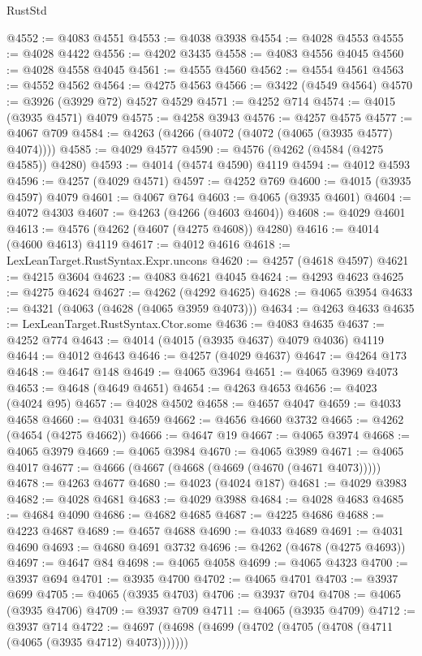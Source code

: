 \begin{lexlean}{RustStd}
\begin{coremodule}
@4552 := @4083 @4551
@4553 := @4038 @3938
@4554 := @4028 @4553
@4555 := @4028 @4422
@4556 := @4202 @3435
@4558 := @4083 @4556 @4045
@4560 := @4028 @4558 @4045
@4561 := @4555 @4560
@4562 := @4554 @4561
@4563 := @4552 @4562
@4564 := @4275 @4563
@4566 := @3422 (@4549 @4564)
@4570 := @3926 (@3929 @72) @4527 @4529
@4571 := @4252 @714
@4574 := @4015 (@3935 @4571) @4079
@4575 := @4258 @3943
@4576 := @4257 @4575
@4577 := @4067 @709
@4584 := @4263 (@4266 (@4072 (@4072 (@4065 (@3935 @4577) @4074))))
@4585 := @4029 @4577
@4590 := @4576 (@4262 (@4584 (@4275 @4585)) @4280)
@4593 := @4014 (@4574 @4590) @4119
@4594 := @4012 @4593
@4596 := @4257 (@4029 @4571)
@4597 := @4252 @769
@4600 := @4015 (@3935 @4597) @4079
@4601 := @4067 @764
@4603 := @4065 (@3935 @4601)
@4604 := @4072 @4303
@4607 := @4263 (@4266 (@4603 @4604))
@4608 := @4029 @4601
@4613 := @4576 (@4262 (@4607 (@4275 @4608)) @4280)
@4616 := @4014 (@4600 @4613) @4119
@4617 := @4012 @4616
@4618 := LexLeanTarget.RustSyntax.Expr.uncons
@4620 := @4257 (@4618 @4597)
@4621 := @4215 @3604
@4623 := @4083 @4621 @4045
@4624 := @4293 @4623
@4625 := @4275 @4624
@4627 := @4262 (@4292 @4625)
@4628 := @4065 @3954
@4633 := @4321 (@4063 (@4628 (@4065 @3959 @4073)))
@4634 := @4263 @4633
@4635 := LexLeanTarget.RustSyntax.Ctor.some
@4636 := @4083 @4635
@4637 := @4252 @774
@4643 := @4014 (@4015 (@3935 @4637) @4079 @4036) @4119
@4644 := @4012 @4643
@4646 := @4257 (@4029 @4637)
@4647 := @4264 @173
@4648 := @4647 @148
@4649 := @4065 @3964
@4651 := @4065 @3969 @4073
@4653 := @4648 (@4649 @4651)
@4654 := @4263 @4653
@4656 := @4023 (@4024 @95)
@4657 := @4028 @4502
@4658 := @4657 @4047
@4659 := @4033 @4658
@4660 := @4031 @4659
@4662 := @4656 @4660 @3732
@4665 := @4262 (@4654 (@4275 @4662))
@4666 := @4647 @19
@4667 := @4065 @3974
@4668 := @4065 @3979
@4669 := @4065 @3984
@4670 := @4065 @3989
@4671 := @4065 @4017
@4677 := @4666 (@4667 (@4668 (@4669 (@4670 (@4671 @4073)))))
@4678 := @4263 @4677
@4680 := @4023 (@4024 @187)
@4681 := @4029 @3983
@4682 := @4028 @4681
@4683 := @4029 @3988
@4684 := @4028 @4683
@4685 := @4684 @4090
@4686 := @4682 @4685
@4687 := @4225 @4686
@4688 := @4223 @4687
@4689 := @4657 @4688
@4690 := @4033 @4689
@4691 := @4031 @4690
@4693 := @4680 @4691 @3732
@4696 := @4262 (@4678 (@4275 @4693))
@4697 := @4647 @84
@4698 := @4065 @4058
@4699 := @4065 @4323
@4700 := @3937 @694
@4701 := @3935 @4700
@4702 := @4065 @4701
@4703 := @3937 @699
@4705 := @4065 (@3935 @4703)
@4706 := @3937 @704
@4708 := @4065 (@3935 @4706)
@4709 := @3937 @709
@4711 := @4065 (@3935 @4709)
@4712 := @3937 @714
@4722 := @4697 (@4698 (@4699 (@4702 (@4705 (@4708 (@4711 (@4065 (@3935 @4712) @4073)))))))

\end{coremodule}
\end{lexlean}
